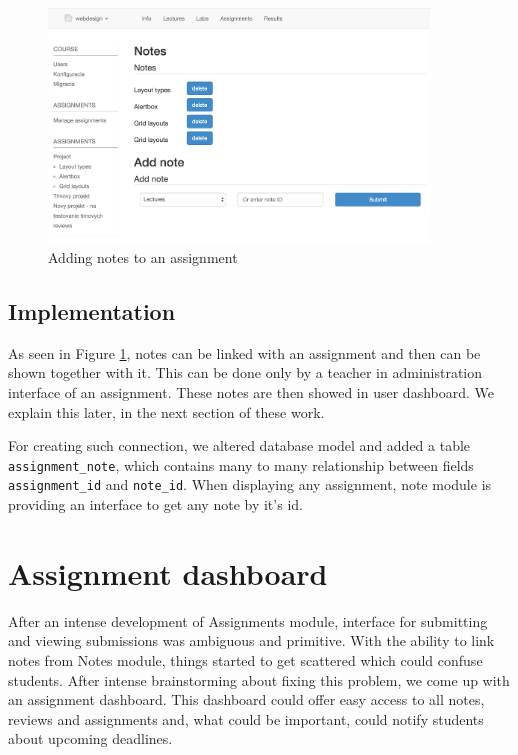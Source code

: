 \begin{figure}[h]
    \centering
    \includegraphics[width=0.9\textwidth]{images/notes.png}
    \caption{Adding notes to an assignment}
    \label{assignmentnote}
\end{figure}

\subsection{Implementation}
As seen in Figure \ref{assignmentnote}, notes can be linked with an assignment and then can be shown together with it. This can be done only by a teacher in administration interface of an assignment. These notes are then showed in user dashboard. We explain this later, in the next section of these work.


For creating such connection, we altered database model and added a table \texttt{assignment\_note}, which contains many to many relationship between fields \texttt{assignment\_id} and \texttt{note\_id}. When displaying any assignment, note module is providing an interface to get any note by it's id.


\section{Assignment dashboard}

After an intense development of Assignments module, interface for submitting and viewing submissions was ambiguous and primitive. With the ability to link notes from Notes module, things started to get scattered which could confuse students. After intense brainstorming about fixing this problem, we come up with an assignment dashboard. This dashboard could offer easy access to all notes, reviews and assignments and, what could be important, could notify students about upcoming deadlines.

